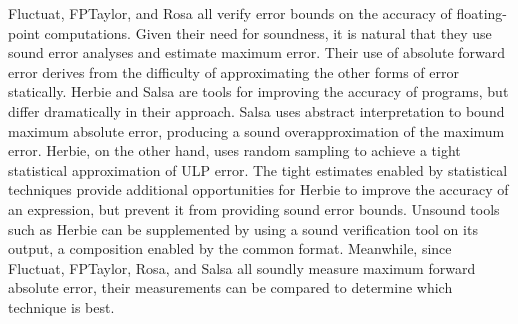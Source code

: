 \documentclass[main.tex]{subfiles}
\begin{document}
Fluctuat, FPTaylor, and Rosa all verify error bounds
  on the accuracy of floating-point computations.
Given their need for soundness, it is natural
  that they use sound error analyses and estimate maximum error.
Their use of absolute forward error derives from the difficulty
  of approximating the other forms of error statically.
Herbie and Salsa are tools for improving the accuracy of programs,
  but differ dramatically in their approach.
Salsa uses abstract interpretation to bound maximum absolute error,
  producing a sound overapproximation of the maximum error.
Herbie, on the other hand, uses random sampling to achieve
  a tight statistical approximation of ULP error.
The tight estimates enabled by statistical techniques
  provide additional opportunities for Herbie
  to improve the accuracy of an expression,
  but prevent it from providing sound error bounds.
Unsound tools such as Herbie can be supplemented
  by using a sound verification tool on its output,
  a composition enabled by the common \core format.
Meanwhile, since Fluctuat, FPTaylor, Rosa, and Salsa
  all soundly measure maximum forward absolute error,
  their measurements can be compared to determine which technique is best.


 
\end{document}
